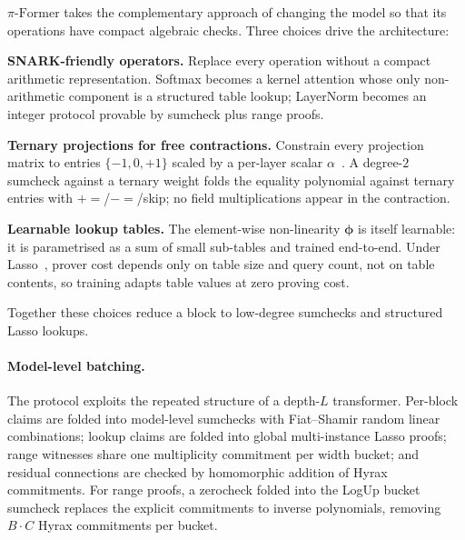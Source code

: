 \documentclass[letterpaper,twocolumn,10pt]{article}
\theoremstyle{remark}
\theoremstyle{definition}
\newcommand{\sys}{\ensuremath{\pi\text{-Former}}}
\newcommand{\bphi}{\boldsymbol{\phi}}
\begin{document}
\sys{} takes the complementary approach of changing the model so that
its operations have compact algebraic checks. Three choices drive the
architecture:

\textbf{SNARK-friendly operators.} Replace every operation
        without a compact arithmetic representation. Softmax becomes
        a kernel attention whose only non-arithmetic component is a
        structured table lookup; LayerNorm becomes an integer
        protocol provable by sumcheck plus range proofs.

\textbf{Ternary projections for free contractions.}
        Constrain every projection matrix to entries
        $\{-1,0,+1\}$ scaled by a per-layer scalar
        $\alpha$~\cite{ma2025bitnet}. A degree-$2$ sumcheck against
        a ternary weight folds the equality polynomial against
        ternary entries with $+\!=$/$-\!=$/skip; no field
        multiplications appear in the contraction.

\textbf{Learnable lookup tables.} The element-wise
        non-linearity $\bphi$ is itself learnable: it is parametrised
        as a sum of small sub-tables and trained end-to-end. Under
        Lasso~\cite{setty2024unlocking}, prover cost depends only on
        table size and query count, not on table contents, so
        training adapts table values at zero proving cost.

Together these choices reduce a block to low-degree sumchecks and
structured Lasso lookups.

\paragraph{Model-level batching.}
The protocol exploits the repeated structure of a depth-$L$
transformer. Per-block claims are folded into model-level sumchecks
with Fiat--Shamir random linear combinations; lookup claims are folded
into global multi-instance Lasso proofs; range witnesses share one
multiplicity commitment per width bucket; and residual connections
are checked by homomorphic addition of Hyrax commitments. For range
proofs, a zerocheck folded into the LogUp bucket sumcheck replaces
the explicit commitments to inverse polynomials, removing
$B\cdot C$ Hyrax commitments per bucket.
\end{document}
